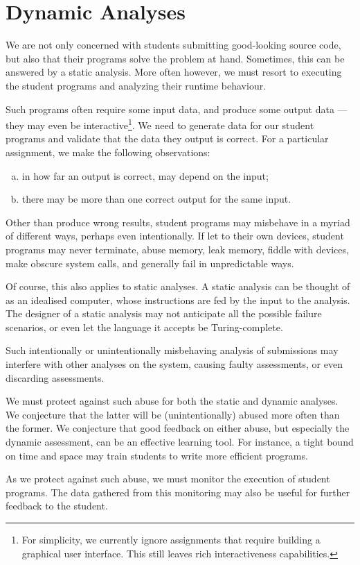 
\section{Dynamic Analyses}

We are not only concerned with students submitting good-looking source code,
but also that their programs solve the problem at hand. Sometimes, this can be
answered by a static analysis. More often however, we must resort to executing
the student programs and analyzing their runtime behaviour.

Such programs often require some input data, and produce some output data ---
they may even be interactive\footnote{For simplicity, we currently ignore
assignments that require building a graphical user interface. This still leaves
rich interactiveness capabilities.}. We need to generate data for our student
programs and validate that the data they output is correct. For a particular
assignment, we make the following observations:

\begin{enumerate}[(a)]

\item in how far an output is correct, may depend on the input;

\item there may be more than one correct output for the same input.

\end{enumerate}

Other than produce wrong results, student programs may misbehave in a myriad of
different ways, perhaps even intentionally. If let to their own devices,
student programs may never terminate, abuse memory, leak memory, fiddle with
devices, make obscure system calls, and generally fail in unpredictable ways.

Of course, this also applies to static analyses. A static analysis can be
thought of as an idealised computer, whose instructions are fed by the input to
the analysis. The designer of a static analysis may not anticipate all the
possible failure scenarios, or even let the language it accepts be
Turing-complete.

Such intentionally or unintentionally misbehaving analysis of submissions may
interfere with other analyses on the system, causing faulty assessments, or
even discarding assessments.

We must protect against such abuse for both the static and dynamic analyses. We
conjecture that the latter will be (unintentionally) abused more often than the
former. We conjecture that good feedback on either abuse, but especially the
dynamic assessment, can be an effective learning tool. For instance, a tight
bound on time and space may train students to write more efficient programs.

As we protect against such abuse, we must monitor the execution of student
programs. The data gathered from this monitoring may also be useful for further
feedback to the student.
